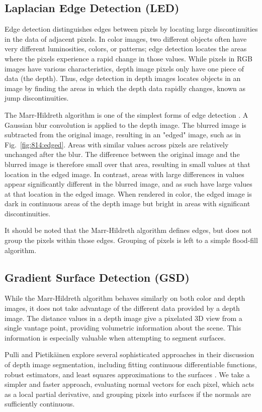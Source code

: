 \subsection{Laplacian Edge Detection (LED)}
\label{subsec:laplacian}
Edge detection distinguishes edges between pixels by locating large discontinuities in the data of adjacent pixels. In color images, two different
objects often have very different luminosities, colors, or
patterns; edge detection locates the areas where the pixels
experience a rapid change in those values. While pixels in RGB images
have various characteristics, depth image pixels only have one
piece of data (the depth). Thus, edge detection in depth images
locates objects in an image by finding the areas in which the depth
data rapidly changes, known as jump discontinuities. 

The Marr-Hildreth algorithm is one of the simplest forms of edge detection \cite{marr}. A Gaussian blur convolution is applied to the depth image. The blurred image is subtracted from the original image, resulting
in an "edged" image, such as in Fig.~\ref{fig:814:edged}. Areas with similar values across pixels are
relatively unchanged after the blur.   The difference between the original image and the blurred image is therefore small over that area, resulting in small values at that location in the edged image. In contrast, areas with large
differences in values appear significantly different in the blurred image, and as such have large values at that location in the edged image. When rendered in color, the edged image is dark in continuous areas of the depth image but bright in areas with significant discontinuities. 

It should be noted that the Marr-Hildreth algorithm defines edges, but does not group the pixels within those edges.  Grouping of pixels is left to a simple flood-fill algorithm.

\subsection{Gradient Surface Detection (GSD)}
\label{subsec:gradient}
While the Marr-Hildreth algorithm behaves similarly on both color and depth images, it does not take advantage of the different data provided by a depth image.  The distance values in a depth image give a pixelated 3D view from a single vantage point, providing volumetric information about the scene.  This information is especially valuable when attempting to segment surfaces.

Pulli and Pietik{\"a}inen explore several sophisticated approaches in their discussion of depth image segmentation, including fitting continuous differentiable functions, robust estimators, and least squares approximations to the surfaces \cite{pulli}.  We take a simpler and faster approach, evaluating normal vectors for each pixel, which acts as a local partial derivative, and grouping pixels into surfaces if the normals are sufficiently continuous.  

